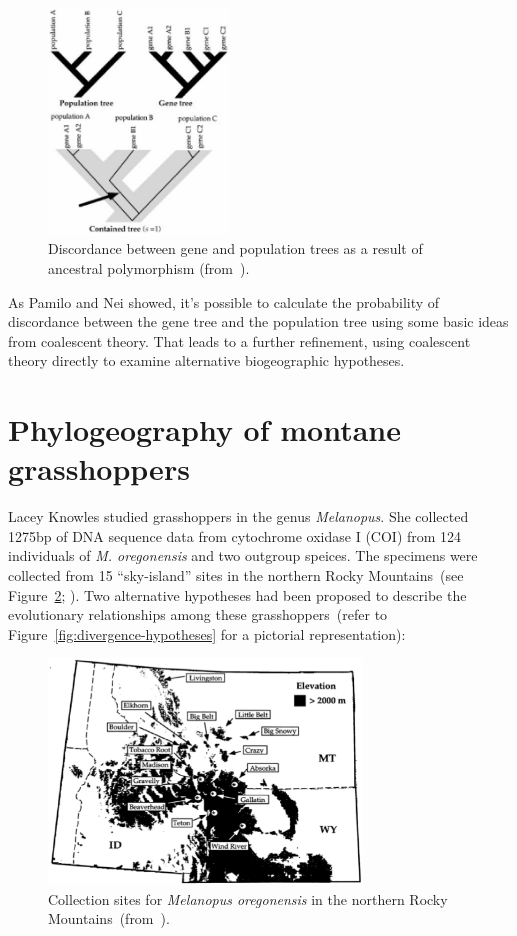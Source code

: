 \documentclass[12pt]{article}
\begin{document}
\begin{figure}
\begin{center}
\includegraphics[height=6cm]{ancestral-polymorphism.eps}
\end{center}
\caption{Discordance between gene and population trees as a result of
  ancestral polymorphism
  (from~\cite{Knowles-2001}).}\label{fig:ancestral-polymorphism} 
\end{figure}

As Pamilo and Nei showed, it's possible to calculate the probability
of discordance between the gene tree and the population tree using
some basic ideas from coalescent theory. That leads to a further
refinement, using coalescent theory directly to examine alternative
biogeographic hypotheses.

\section*{Phylogeography of montane grasshoppers}

Lacey Knowles studied grasshoppers in the genus {\it Melanopus}. She
collected 1275bp of DNA sequence data from cytochrome oxidase I (COI)
from 124 individuals of {\it M. oregonensis\/} and two outgroup
speices. The specimens were collected from 15 ``sky-island'' sites in
the northern Rocky Mountains~(see Figure~\ref{fig:sky-islands};
\cite{Knowles-2001}). Two alternative hypotheses had been proposed to
describe the evolutionary relationships among these
grasshoppers~(refer to Figure~\ref{fig:divergence-hypotheses} for a
pictorial representation):

\begin{figure}
\begin{center}
\includegraphics[height=6cm]{sky-islands.eps}
\end{center}
\caption{Collection sites for {\it Melanopus oregonensis\/} in the
  northern Rocky Mountains~(from~\cite{Knowles-2001}).}\label{fig:sky-islands}
\end{figure}
\end{document}
